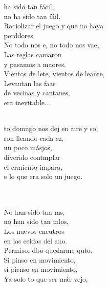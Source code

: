 \begin{cancion}%
	ha sido tan fácil, \\
	no ha sido tan fáil,\\
	Raciolizar el juego y que no haya \\
	perddores.\\
\jump
	No todo nos e, no todo nos vae,\\
	Las reglas camaron \\
	y pasamos a maores.\\
\jump
	Vientos de lete, vientos de leante,\\
	Levantan las faas \\
	de vecinas y cantanes,\\
era inevitable...\\\jump\\
	\begin{chorus}%
	to domngo nos dej en aire y so, \\
	ron lleando cada ez, \\
	un poco másjos,\\
	 diverido contmplar  \\
	el crmiento impara,\\
	e lo que era solo un juego.\\
	\end{chorus}%
	\jump\\
	   \\
	No han sido tan ms, \\
	no han sido tan mlos,\\
	Los nuevos encutros  \\
	en las celdas del ano.\\
\jump
	Permiso, dbo quedarme quto.\\
	Si pinso en movimiento,\\
si pienso en movimiento,\\
\jump
	Ya solo to que ser más vejo, \\

\end{cancion}

